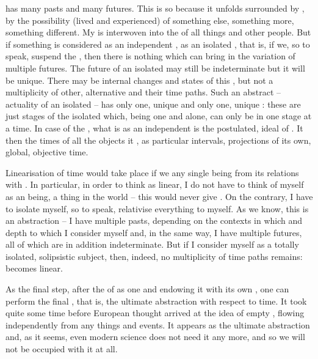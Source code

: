  has many pasts and many futures.  This is so because it unfolds
surrounded by , by the possibility (lived and experienced) of
something else, something more, something different. My  is
interwoven into the  of all things and other people. But if
something is considered as an independent , as an isolated
, that is, if we, so to speak, suspend the , then
there is nothing which can bring in the variation of multiple futures. The
future of an isolated  may still be indeterminate but it will be
unique.  There may be internal changes and states of this , but not a
multiplicity of other, alternative  and their time paths.  Such an
abstract  -- actuality of an isolated  -- has only one,
unique  and only one, unique : these are just stages of the
isolated  which, being one and alone, can only be in one stage at a
time. In case of the , what is  as an independent
 is the postulated, ideal  of . It then
 the times of all the objects it , as particular
intervals, projections of its own, global, objective time.

\label{pa:mytime}
Linearisation of time would take place if we  any single being 
from its relations with . In particular, in order to 
think  as linear, I do not have to think of myself as 
an  being, a thing in the world -- this would never 
give . On the contrary, I have to isolate myself, so to speak, 
relativise everything to myself. As we know, this is an abstraction -- 
I have multiple pasts, depending on the contexts in which and depth to which I consider 
myself and, in the same way, I have multiple futures, all of which are in
addition indeterminate. But if I consider myself as a totally isolated,
solipsistic subject, then, indeed, no multiplicity of time paths remains:  becomes linear.  
%

As the final step, after  the  of  as one
 and endowing it with its own , one can perform the final
, that is, the ultimate abstraction with respect to time.  It
took quite some time before European thought arrived at the idea of empty
, flowing independently from any things and
events.
It appears as the ultimate abstraction and, as it seems, even modern science
does not need it any more, and so we will not be occupied with it at all.

